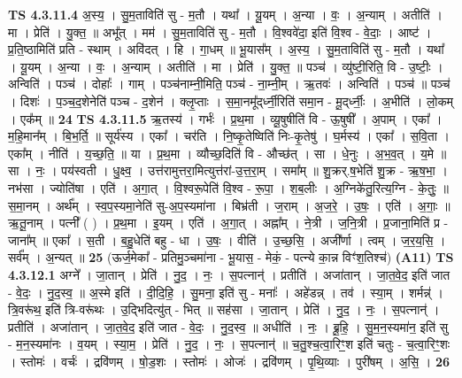 \documentclass[17pt]{extarticle}
\begin{document}
                  \newline
                                \textbf{ TS 4.3.11.4} \newline
                  अ॒स्य॒ । सु॒म॒ताविति॑ सु - म॒तौ । यथा᳚ । यू॒यम् । अ॒न्या । वः॒ । अ॒न्याम् । अतीति॑ । मा । प्रेति॑ । यु॒क्त॒ ॥ अभू᳚त् । मम॑ । सु॒म॒ताविति॑ सु - म॒तौ । वि॒श्ववे॑दा॒ इति॑ वि॒श्व - वे॒दाः॒ । आष्ट॑ । प्र॒ति॒ष्ठामिति॑ प्रति - स्थाम् । अवि॑दत् । हि । गा॒धम् ॥ भू॒यास᳚म् । अ॒स्य॒ । सु॒म॒ताविति॑ सु - म॒तौ । यथा᳚ । यू॒यम् । अ॒न्या । वः॒ । अ॒न्याम् । अतीति॑ । मा । प्रेति॑ । यु॒क्त॒ ॥ पञ्च॑ । व्यु॑ष्टी॒रिति॒ वि - उ॒ष्टीः॒ । अन्विति॑ । पञ्च॑ । दोहाः᳚ । गाम् । पञ्च॑नाम्नी॒मिति॒ पञ्च॑ - ना॒म्नी॒म् । ऋ॒तवः॑ । अन्विति॑ । पञ्च॑ ॥ पञ्च॑ । दिशः॑ । प॒ञ्च॒द॒शेनेति॑ पञ्च - द॒शेन॑ । क्लृ॒प्ताः । स॒मा॒नमू᳚द्‌र्ध्नी॒रिति॑ समा॒न - मू॒द्‌र्ध्नीः॒ । अ॒भीति॑ । लो॒कम् । एक᳚म् ॥ \textbf{  24} \newline
                  \newline
                                \textbf{ TS 4.3.11.5} \newline
                  ऋ॒तस्य॑ । गर्भः॑ । प्र॒थ॒मा । व्यू॒षुषीति॑ वि - ऊ॒षुषी᳚ । अ॒पाम् । एका᳚ । म॒हि॒मान᳚म् । बि॒भ॒र्ति॒ ॥ सूर्य॑स्य । एका᳚ । चर॑ति । नि॒ष्कृ॒तेष्विति॑ निः-कृ॒तेषु॑ । घ॒र्मस्य॑ । एका᳚ । स॒वि॒ता । एका᳚म् । नीति॑ । य॒च्छ॒ति॒ ॥ या । प्र॒थ॒मा । व्यौच्छ॒दिति॑ वि - औच्छ॑त् । सा । धे॒नुः । अ॒भ॒व॒त् । य॒मे ॥ सा । नः॒ । पय॑स्वती । धु॒क्ष्व॒ । उत्त॑रामुत्तरा॒मित्युत्त॑रां-उ॒त्त॒रा॒म् । समा᳚म् ॥ शु॒क्रर्.ष॒भेति॑ शु॒क्र - ऋ॒ष॒भा॒ । नभ॑सा । ज्योति॑षा । एति॑ । अ॒गा॒त् । वि॒श्वरू॒पेति॑ वि॒श्व - रू॒पा॒ । श॒ब॒लीः । अ॒ग्निके॑तु॒रित्य॒ग्नि - के॒तुः॒ ॥ स॒मा॒नम् । अर्थ᳚म् । स्व॒प॒स्यमा॒नेति॑ सु-अ॒प॒स्यमा॑ना । बिभ्र॑ती । ज॒राम् । अ॒ज॒रे॒ । उ॒षः॒ । एति॑ । अ॒गाः॒ ॥ ऋ॒तू॒नाम् । पत्नी᳚ ( ) । प्र॒थ॒मा । इ॒यम् । एति॑ । अ॒गा॒त् । अह्ना᳚म् । ने॒त्री । ज॒नि॒त्री । प्र॒जाना॒मिति॑ प्र - जाना᳚म् ॥ एका᳚ । स॒ती । ब॒हु॒धेति॑ बहु - धा । उ॒षः॒ । वीति॑ । उ॒च्छ॒सि॒ । अजी᳚र्णा । त्वम् । ज॒र॒य॒सि॒ । सर्व᳚म् । अ॒न्यत् ॥ \textbf{  25 } \newline
                  \newline
                      (ऊर्ज॒मेका᳚ - प्रतिमु॒ञ्चमा॑ना - भू॒यास॒ - मेकं॒ - पत्न्ये का॒न्न विꣳ॑श॒तिश्च॑)  \textbf{(A11)} \newline \newline
                                \textbf{ TS 4.3.12.1} \newline
                  अग्ने᳚ । जा॒तान् । प्रेति॑ । नु॒द॒ । नः॒ । स॒पत्नान्॑ । प्रतीति॑ । अजा॑तान् । जा॒त॒वे॒द॒ इति॑ जात - वे॒दः॒ । नु॒द॒स्व॒ ॥ अ॒स्मे इति॑ । दी॒दि॒हि॒ । सु॒मना॒ इति॑ सु - मनाः᳚ । अहे॑डन्न् । तव॑ । स्या॒म् । शर्मन्न्॑ । त्रि॒वरू॑थ॒ इति॑ त्रि-वरू॑थः । उ॒द्भिदित्यु॑त् - भित् ॥ सह॑सा । जा॒तान् । प्रेति॑ । नु॒द॒ । नः॒ । स॒पत्नान्॑ । प्रतीति॑ । अजा॑तान् । जा॒त॒वे॒द॒ इति॑ जात - वे॒दः॒ । नु॒द॒स्व॒ ॥ अधीति॑ । नः॒ । ब्रू॒हि॒ । सु॒म॒न॒स्यमा॑न॒ इति॑ सु - म॒न॒स्यमा॑नः । व॒यम् । स्या॒म॒ । प्रेति॑ । नु॒द॒ । नः॒ । स॒पत्नान्॑ ॥ च॒तु॒श्च॒त्वा॒रिꣳ॒॒श इति॑ चतुः - च॒त्वा॒रिꣳ॒॒शः । स्तोमः॑ । वर्चः॑ । द्रवि॑णम् । षो॒ड॒शः । स्तोमः॑ । ओजः॑ । द्रवि॑णम् । पृ॒थि॒व्याः । पुरी॑षम् । अ॒सि॒ । \textbf{  26} \newline
\end{document}
